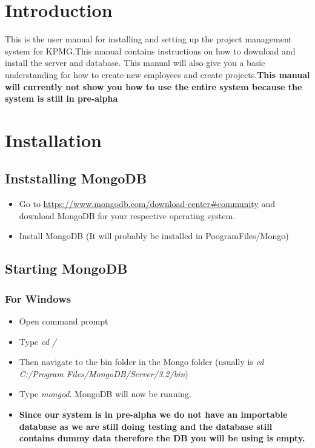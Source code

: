 \documentclass[a4paper,12pt]{article}
\begin{document}
\section{Introduction}
	This is the user manual for installing and setting up the project management system for KPMG.This manual contains instructions on how to download and install the server and database. This manual will also give you a basic understanding for how to create new employees and create projects.\linebreak\linebreak\textbf{This manual will currently not show you how to use the entire system because the system is still in pre-alpha}
\section{Installation}
\subsection{Inststalling MongoDB}
	\begin{itemize}
		\item Go to \url{ https://www.mongodb.com/download-center#community} and download MongoDB for your respective operating system.
		\item Install MongoDB (It will probably be installed in PoogramFiles/Mongo)
	\end{itemize}
\subsection{Starting MongoDB}
	\subsubsection{For Windows}
		\begin{itemize}
			\item Open command prompt
			\item Type \textit{cd /}
			\item Then navigate to the bin folder in the Mongo folder \linebreak (usually is \textit{cd C:/Program Files/MongoDB/Server/3.2/bin})
			\item Type \textit{mongod}. MongoDB will now be running.
			\item \textbf{Since our system is in pre-alpha we do not have an importable database as we are still doing testing and the database still contains dummy data therefore the DB you will be using is empty.}
		\end{itemize}
	
\end{document}
